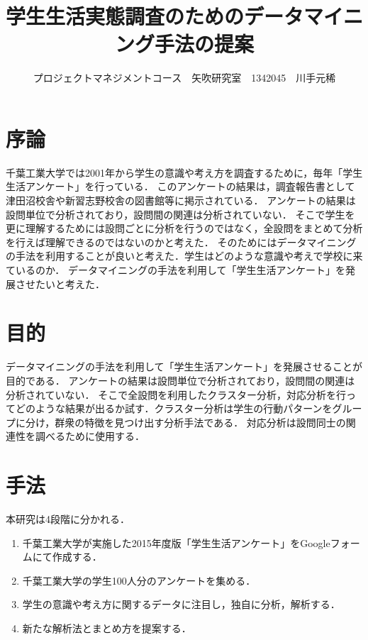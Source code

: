 \documentclass[uplatex,twocolumn,dvipdfmx]{jsarticle}
\title{\vspace{-5mm}\fontsize{14pt}{0pt}\selectfont 学生生活実態調査のためのデータマイニング手法の提案}
\author{\normalsize プロジェクトマネジメントコース　矢吹研究室　1342045　川手元稀}
\date{}
\begin{document}
\fontsize{10.5pt}{\baselineskip}\selectfont
\maketitle





\section{序論}
千葉工業大学では2001年から学生の意識や考え方を調査するために，毎年「学生生活アンケート」を行っている．
このアンケートの結果は，調査報告書として津田沼校舎や新習志野校舎の図書館等に掲示されている．\cite{a}
アンケートの結果は設問単位で分析されており，設問間の関連は分析されていない．
そこで学生を更に理解するためには設問ごとに分析を行うのではなく，全設問をまとめて分析を行えば理解できるのではないのかと考えた．
そのためにはデータマイニングの手法を利用することが良いと考えた．学生はどのような意識や考えで学校に来ているのか．
データマイニングの手法を利用して「学生生活アンケート」を発展させたいと考えた．

\section{目的}
データマイニングの手法を利用して「学生生活アンケート」を発展させることが目的である．
アンケートの結果は設問単位で分析されており，設問間の関連は分析されていない．
そこで全設問を利用したクラスター分析，対応分析を行ってどのような結果が出るか試す．クラスター分析は学生の行動パターンをグループに分け，群衆の特徴を見つけ出す分析手法である\cite{b}．
対応分析は設問同士の関連性を調べるために使用する\cite{b}．
\section{手法}
本研究は4段階に分かれる．
\begin{enumerate}
\item 千葉工業大学が実施した2015年度版「学生生活アンケート」をGoogleフォームにて作成する．
\item 千葉工業大学の学生100人分のアンケートを集める．
\item 学生の意識や考え方に関するデータに注目し，独自に分析，解析する．
\item 新たな解析法とまとめ方を提案する．
\end{enumerate}
\end{document}
